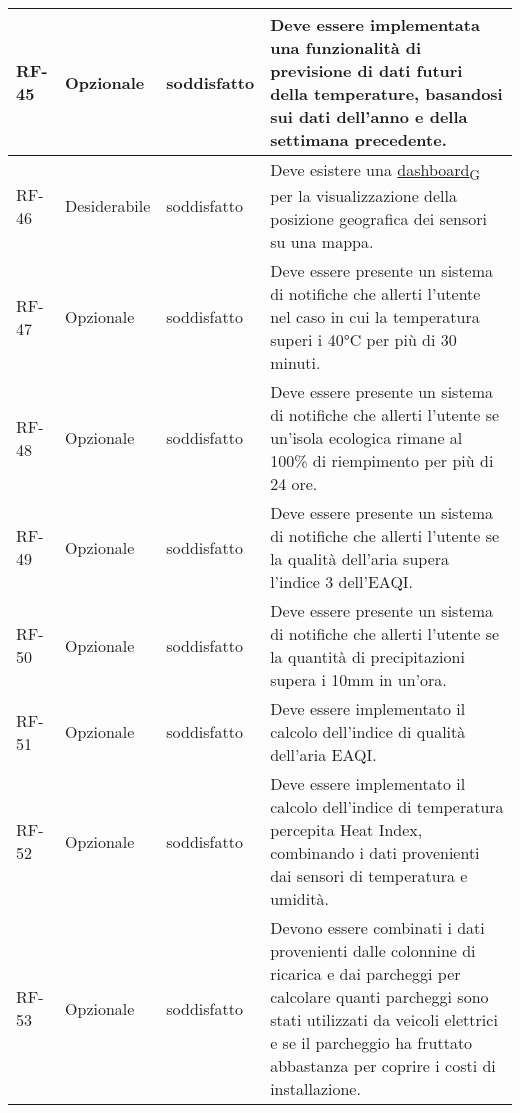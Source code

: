 \begin{longtable}{|>{\centering\arraybackslash}m{}|>{\centering\arraybackslash}m{}|>{\centering\arraybackslash}m{}|>{\centering\arraybackslash}m{}|}
	\\\hline
	RF-45           & Opzionale           & soddisfatto & Deve essere implementata una funzionalità di previsione di dati futuri della temperature, basandosi sui dati dell'anno e della settimana precedente.
	\\\hline
	RF-46           & Desiderabile        & soddisfatto & Deve esistere una \href{https://7last.github.io/docs/pb/documentazione-interna/glossario\#dashboard}{dashboard\textsubscript{G}} per la visualizzazione della posizione geografica dei sensori su una mappa.
	\\\hline
	RF-47           & Opzionale           & soddisfatto & Deve essere presente un sistema di notifiche che allerti l'utente nel caso in cui la temperatura superi i 40°C per più di 30 minuti.
	\\\hline
	RF-48           & Opzionale           & soddisfatto                                                                                                           & Deve essere presente un sistema di notifiche che allerti l'utente se un'isola ecologica rimane al 100\% di riempimento per più di 24 ore.
	\\\hline
	RF-49           & Opzionale           & soddisfatto                                                                                                           & Deve essere presente un sistema di notifiche che allerti l'utente se la qualità dell'aria supera l'indice 3 dell'EAQI.
	\\\hline
	RF-50           & Opzionale           & soddisfatto                                                                                                           & Deve essere presente un sistema di notifiche che allerti l'utente se la quantità di precipitazioni supera i 10mm in un'ora.
	\\\hline
	RF-51           & Opzionale           & soddisfatto                                                                                                           & Deve essere implementato il calcolo dell'indice di qualità dell'aria EAQI.
	\\\hline
	RF-52           & Opzionale           & soddisfatto                                                                                                           & Deve essere implementato il calcolo dell'indice di temperatura percepita Heat Index, combinando i dati provenienti dai sensori di temperatura e umidità.
	\\\hline
	RF-53           & Opzionale           & soddisfatto                                                                                                           & Devono essere combinati i dati provenienti dalle colonnine di ricarica e dai parcheggi per calcolare quanti parcheggi sono stati utilizzati da veicoli elettrici e se il parcheggio ha fruttato abbastanza per coprire i costi di installazione.

\end{longtable}
